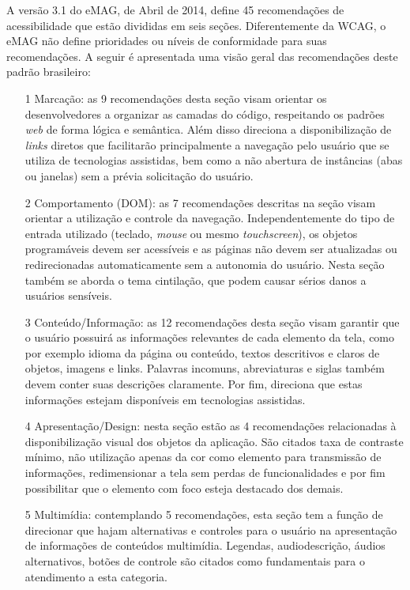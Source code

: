 A versão 3.1 do eMAG, de Abril de 2014, define 45 recomendações de acessibilidade que estão divididas em seis seções. Diferentemente da WCAG, o eMAG não define prioridades ou níveis de conformidade para suas recomendações. A seguir é apresentada uma visão geral das recomendações deste padrão brasileiro:
\begin{itemize}
	\item[1] Marcação: as 9 recomendações desta seção visam orientar os desenvolvedores a organizar as camadas do código, respeitando os padrões \textit{web} de forma lógica e semântica. Além disso direciona a disponibilização de \textit{links} diretos que facilitarão principalmente a navegação pelo usuário que se utiliza de tecnologias assistidas, bem como a não abertura de instâncias (abas ou janelas) sem a prévia solicitação do usuário.
	
	\item[2] Comportamento (DOM): as 7 recomendações descritas na seção visam orientar a utilização e controle da navegação. Independentemente do tipo de entrada utilizado (teclado, \textit{mouse} ou mesmo \textit{touchscreen}), os objetos programáveis devem ser acessíveis e as páginas não devem ser atualizadas ou redirecionadas automaticamente sem a autonomia do usuário. Nesta seção também se aborda o tema cintilação, que podem causar sérios danos a usuários sensíveis.
	
	\item[3] Conteúdo/Informação: as 12 recomendações desta seção visam garantir que o usuário possuirá as informações relevantes de cada elemento da tela, como por exemplo idioma da página ou conteúdo, textos descritivos e claros de objetos, imagens e links. Palavras incomuns, abreviaturas e siglas também devem conter suas descrições claramente. Por fim, direciona que estas informações estejam disponíveis em tecnologias assistidas.

	\item[4] Apresentação/Design: nesta seção estão as 4 recomendações relacionadas à disponibilização visual dos objetos da aplicação. São citados taxa de contraste mínimo, não utilização apenas da cor como elemento para transmissão de informações, redimensionar a tela sem perdas de funcionalidades e por fim possibilitar que o elemento com foco esteja destacado dos demais.
	
	\item[5] Multimídia: contemplando 5 recomendações, esta seção tem a função de direcionar que hajam alternativas e controles para o usuário na apresentação de informações de conteúdos multimídia. Legendas, audiodescrição, áudios alternativos, botões de controle são citados como fundamentais para o atendimento a esta categoria.	
	

\end{itemize}
